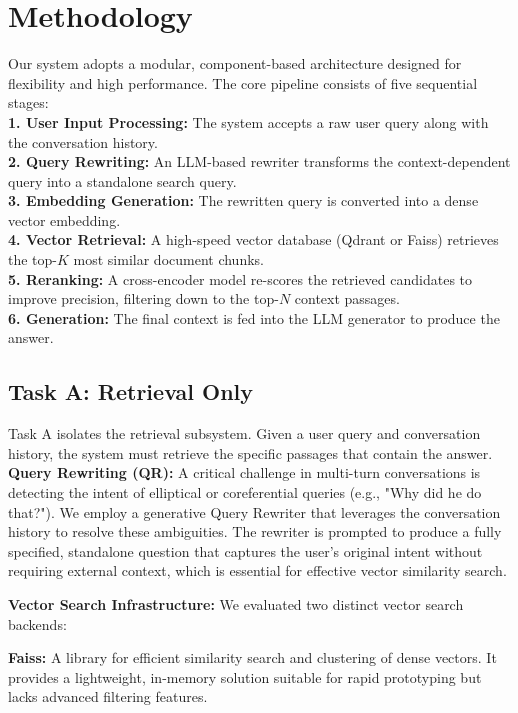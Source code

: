 \documentclass[11pt]{article}
\begin{document}
\section{Methodology}
 Our system adopts a modular, component-based architecture designed for flexibility and high performance. The core pipeline consists of five sequential stages: \\
    \textbf{1. User Input Processing:} The system accepts a raw user query along with the conversation history. \\
    \textbf{2. Query Rewriting:} An LLM-based rewriter transforms the context-dependent query into a standalone search query. \\
    \textbf{3. Embedding Generation:} The rewritten query is converted into a dense vector embedding. \\
    \textbf{4. Vector Retrieval:} A high-speed vector database (Qdrant or Faiss) retrieves the top-$K$ most similar document chunks. \\
    \textbf{5. Reranking:} A cross-encoder model re-scores the retrieved candidates to improve precision, filtering down to the top-$N$ context passages. \\
    \textbf{6. Generation:} The final context is fed into the LLM generator to produce the answer.
    
    
    \subsection{Task A: Retrieval Only}
    Task A isolates the retrieval subsystem. Given a user query and conversation history, the system must retrieve the specific passages that contain the answer.
    \textbf{Query Rewriting (QR):} A critical challenge in multi-turn conversations is detecting the intent of elliptical or coreferential queries (e.g., "Why did he do that?"). We employ a generative Query Rewriter that leverages the conversation history to resolve these ambiguities. The rewriter is prompted to produce a fully specified, standalone question that captures the user's original intent without requiring external context, which is essential for effective vector similarity search.
    
\textbf{Vector Search Infrastructure:} We evaluated two distinct vector search backends:

\textbf{Faiss:} A library for efficient similarity search and clustering of dense vectors. It provides a lightweight, in-memory solution suitable for rapid prototyping but lacks advanced filtering features.
\end{document}
